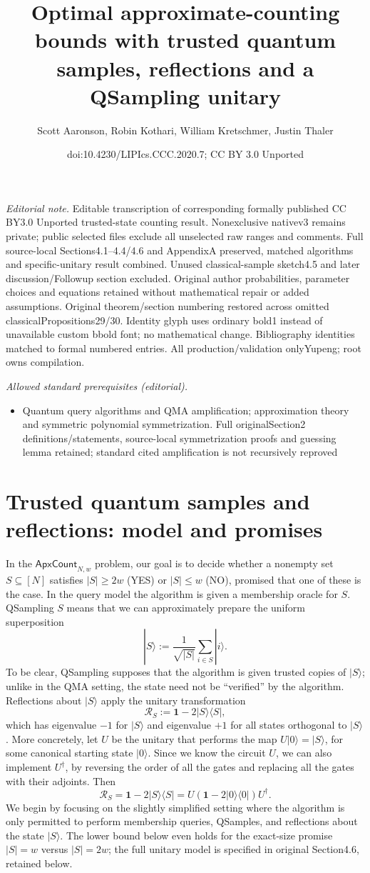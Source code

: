 \documentclass[10pt,a4paper]{article}
\title{Optimal approximate-counting bounds with trusted quantum samples, reflections and a QSampling unitary}
\author{Scott Aaronson, Robin Kothari, William Kretschmer, Justin Thaler}
\date{doi:10.4230/LIPIcs.CCC.2020.7; CC BY 3.0 Unported}
\newcommand{\<}{\langle}
\renewcommand{\>}{\rangle}
\newcommand{\ApxCount}{\mathsf{ApxCount}_{N,w}}
\newcommand{\id}{\mathbf 1}
\begin{document}
\maketitle
\noindent\textit{Editorial note.} Editable transcription of corresponding formally published CC BY3.0 Unported trusted-state counting result. Nonexclusive nativev3 remains private; public selected files exclude all unselected raw ranges and comments. Full source-local Sections4.1–4.4/4.6 and AppendixA preserved, matched algorithms and specific-unitary result combined. Unused classical-sample sketch4.5 and later discussion/Followup section excluded. Original author probabilities, parameter choices and equations retained without mathematical repair or added assumptions. Original theorem/section numbering restored across omitted classicalPropositions29/30. Identity glyph uses ordinary bold1 instead of unavailable custom bbold font; no mathematical change. Bibliography identities matched to formal numbered entries. All production/validation onlyYupeng; root owns compilation.\par\medskip
\noindent\textit{Allowed standard prerequisites (editorial).}\begin{itemize}
\item Quantum query algorithms and QMA amplification; approximation theory and symmetric polynomial symmetrization. Full originalSection2 definitions/statements, source-local symmetrization proofs and guessing lemma retained; standard cited amplification is not recursively reproved
\end{itemize}\medskip
\section*{Trusted quantum samples and reflections: model and promises}
In the $\ApxCount$ problem, our goal is to decide whether a nonempty set $S\subseteq[N]$ satisfies $|S|\ge2w$ (YES) or $|S|\le w$ (NO), promised that one of these is the case. In the query model the algorithm is given a membership oracle for $S$.
QSampling $S$ means that we can approximately prepare the uniform superposition
\[|S\rangle:=\frac1{\sqrt{|S|}}\sum_{i\in S}|i\rangle.\]
To be clear, QSampling supposes that the algorithm is given trusted copies of $|S\rangle$; unlike in the QMA setting, the state need not be ``verified'' by the algorithm.
Reflections about $|S\rangle$ apply the unitary transformation
\[\mathcal R_S:=\id-2|S\rangle\langle S|,\]
which has eigenvalue $-1$ for $|S\rangle$ and eigenvalue $+1$ for all states orthogonal to $|S\rangle$. More concretely, let $U$ be the unitary that performs the map $U|0\rangle=|S\rangle$, for some canonical starting state $|0\rangle$. Since we know the circuit $U$, we can also implement $U^\dagger$, by reversing the order of all the gates and replacing all the gates with their adjoints. Then
\[\mathcal R_S=\id-2|S\rangle\langle S|=U(\id-2|0\rangle\langle0|)U^\dagger.\]
We begin by focusing on the slightly simplified setting where the algorithm is only permitted to perform membership queries, QSamples, and reflections about the state $|S\rangle$. The lower bound below even holds for the exact-size promise $|S|=w$ versus $|S|=2w$; the full unitary model is specified in original Section4.6, retained below.
\end{document}
